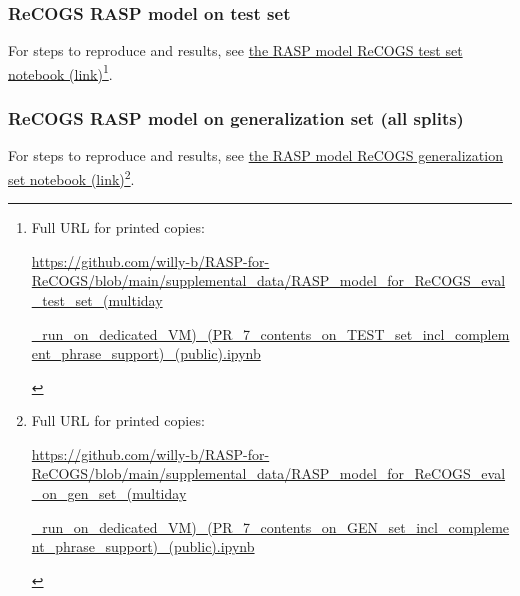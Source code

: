 \documentclass[11pt]{article}
\begin{document}
\subsubsection{ReCOGS RASP model on test set}
For steps to reproduce and results, see \href{https://github.com/willy-b/RASP-for-ReCOGS/blob/main/supplemental\_data/RASP\_model\_for\_ReCOGS\_eval\_test\_set\_(multiday\_run\_on\_dedicated\_VM)\_(PR\_7\_contents\_on\_TEST\_set\_incl\_complement\_phrase\_support)\_(public).ipynb}{the RASP model ReCOGS test set notebook (link)}\footnote{\begin{tiny}Full URL for printed copies: 

\href{https://github.com/willy-b/RASP-for-ReCOGS/blob/main/supplemental\_data/RASP\_model\_for\_ReCOGS\_eval\_test\_set\_(multiday\_run\_on\_dedicated\_VM)\_(PR\_7\_contents\_on\_TEST\_set\_incl\_complement\_phrase\_support)\_(public).ipynb}{https://github.com/willy-b/RASP-for-ReCOGS/blob/main/supplemental\_data/RASP\_model\_for\_ReCOGS\_eval\_test\_set\_(multiday}

\href{https://github.com/willy-b/RASP-for-ReCOGS/blob/main/supplemental\_data/RASP\_model\_for\_ReCOGS\_eval\_test\_set\_(multiday\_run\_on\_dedicated\_VM)\_(PR\_7\_contents\_on\_TEST\_set\_incl\_complement\_phrase\_support)\_(public).ipynb}{\_run\_on\_dedicated\_VM)\_(PR\_7\_contents\_on\_TEST\_set\_incl\_complement\_phrase\_support)\_(public).ipynb}\end{tiny}}.

\subsubsection{ReCOGS RASP model on generalization set (all splits)}
For steps to reproduce and results, see 
\href{https://github.com/willy-b/RASP-for-ReCOGS/blob/main/supplemental\_data/RASP\_model\_for\_ReCOGS\_eval\_on\_gen\_set\_(multiday\_run\_on\_dedicated\_VM)\_(PR\_7\_contents\_on\_GEN\_set\_incl\_complement\_phrase\_support)\_(public).ipynb}{the RASP model ReCOGS generalization set notebook (link)}\footnote{\begin{tiny}Full URL for printed copies: 

\href{https://github.com/willy-b/RASP-for-ReCOGS/blob/main/supplemental\_data/RASP\_model\_for\_ReCOGS\_eval\_on\_gen\_set\_(multiday\_run\_on\_dedicated\_VM)\_(PR\_7\_contents\_on\_GEN\_set\_incl\_complement\_phrase\_support)\_(public).ipynb}{https://github.com/willy-b/RASP-for-ReCOGS/blob/main/supplemental\_data/RASP\_model\_for\_ReCOGS\_eval\_on\_gen\_set\_(multiday}

\href{https://github.com/willy-b/RASP-for-ReCOGS/blob/main/supplemental\_data/RASP\_model\_for\_ReCOGS\_eval\_on\_gen\_set\_(multiday\_run\_on\_dedicated\_VM)\_(PR\_7\_contents\_on\_GEN\_set\_incl\_complement\_phrase\_support)\_(public).ipynb}{\_run\_on\_dedicated\_VM)\_(PR\_7\_contents\_on\_GEN\_set\_incl\_complement\_phrase\_support)\_(public).ipynb}\end{tiny}}.
\end{document}
